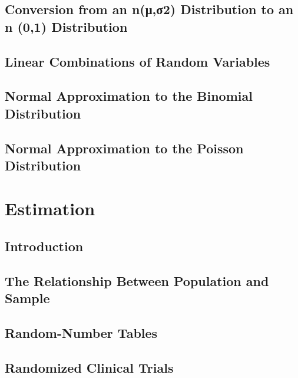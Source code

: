 \documentclass[12pt,]{article}
\theoremstyle{definition}
\theoremstyle{definition}
\theoremstyle{definition}
\theoremstyle{remark}
\begin{document}
\subsection{Conversion from an n(μ,σ2) Distribution to an n (0,1)
Distribution}\label{conversion-from-an-n2-distribution-to-an-n-01-distribution}

\subsection{Linear Combinations of Random
Variables}\label{linear-combinations-of-random-variables}

\subsection{Normal Approximation to the Binomial
Distribution}\label{normal-approximation-to-the-binomial-distribution}

\subsection{Normal Approximation to the Poisson
Distribution}\label{normal-approximation-to-the-poisson-distribution}

\section{Estimation}\label{estimation}

\subsection{Introduction}\label{introduction-4}

\subsection{The Relationship Between Population and
Sample}\label{the-relationship-between-population-and-sample}

\subsection{Random-Number Tables}\label{random-number-tables}

\subsection{Randomized Clinical
Trials}\label{randomized-clinical-trials}
\end{document}
